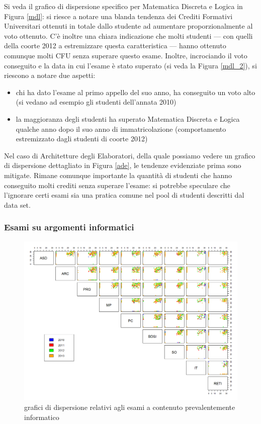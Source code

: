                 Si veda il grafico di dispersione specifico per Matematica Discreta e Logica in Figura \ref{mdl}: si riesce a notare una blanda tendenza dei Crediti Formativi Universitari ottenuti in totale dallo studente ad aumentare proporzionalmente al voto ottenuto. C’è inoltre una chiara indicazione che molti studenti –-- con quelli della coorte 2012 a estremizzare questa caratteristica –-- hanno ottenuto comunque molti CFU senza superare questo esame. Inoltre, incrociando il voto conseguito e la data in cui l’esame è stato superato (si veda la Figura \ref{mdl_2}), si riescono a notare due aspetti:

                \begin{itemize}
                    \item chi ha dato l’esame al primo appello del suo anno, ha conseguito un voto alto (si vedano ad esempio gli studenti dell’annata 2010)
                    \item la maggioranza degli studenti ha superato Matematica Discreta e Logica qualche anno dopo il suo anno di immatricolazione (comportamento estremizzato dagli studenti di coorte 2012)
                \end{itemize}

                Nel caso di Architetture degli Elaboratori, della quale possiamo vedere un grafico di dispersione dettagliato in Figura \ref{ade}, le tendenze evidenziate prima sono mitigate. Rimane comunque importante la quantità di studenti che hanno conseguito molti crediti senza superare l’esame: si potrebbe speculare che l’ignorare certi esami sia una pratica comune nel pool di studenti descritti dal data set.

            \subsubsection{Esami su argomenti informatici}

                \begin{figure}
                    \centering
                    \caption{grafici di dispersione relativi agli esami a contenuto prevalentemente informatico}
                    \label{esami_inf}
                	\includegraphics[scale=0.32]{img/scatter_plot_7_gen.png}
                \end{figure}

